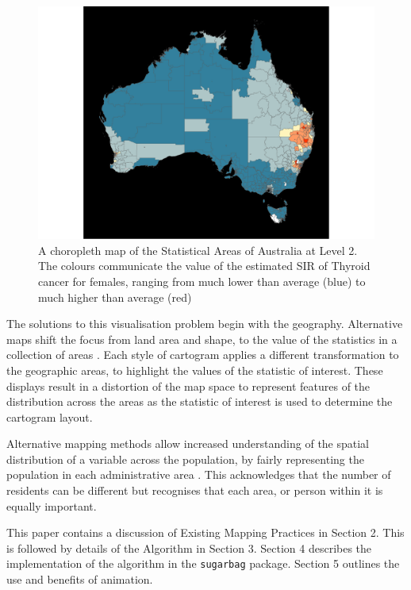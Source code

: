 \begin{Schunk}
\begin{figure}
\includegraphics[width=0.95\linewidth]{kobakian-cook_files/figure-latex/choro-1} \caption[A choropleth map of the Statistical Areas of Australia at Level 2]{A choropleth map of the Statistical Areas of Australia at Level 2. The colours communicate the value of the estimated SIR of Thyroid cancer for females, ranging from much lower than average (blue) to much higher than average (red)}\label{fig:choro}
\end{figure}
\end{Schunk}

The solutions to this visualisation problem begin with the geography.
Alternative maps shift the focus from land area and shape, to the value
of the statistics in a collection of areas \citep{ACCAC}. Each style of
cartogram applies a different transformation to the geographic areas, to
highlight the values of the statistic of interest. These displays result
in a distortion of the map space to represent features of the
distribution across the areas \citep{ACCAC} as the statistic of interest
is used to determine the cartogram layout.

Alternative mapping methods allow increased understanding of the spatial
distribution of a variable across the population, by fairly representing
the population in each administrative area \citep{TAAM}. This
acknowledges that the number of residents can be different but
recognises that each area, or person within it is equally important.

This paper contains a discussion of Existing Mapping Practices in
Section 2. This is followed by details of the Algorithm in Section 3.
Section 4 describes the implementation of the algorithm in the
\texttt{sugarbag} package. Section 5 outlines the use and benefits of
animation.


